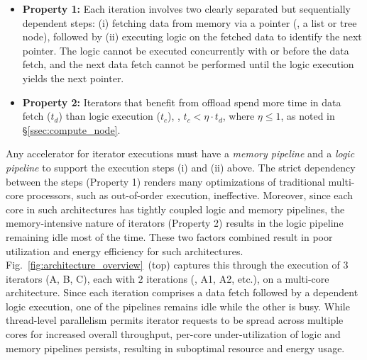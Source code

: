 \begin{itemize}[leftmargin=*, itemsep=0pt]
  \item \textbf{Property 1:} Each iteration involves two clearly separated but sequentially dependent steps: (i) fetching data from memory via a pointer (\eg, a list or tree node), followed by (ii) executing logic on the fetched data to identify the next pointer. The logic cannot be executed concurrently with or before the data fetch, and the next data fetch cannot be performed until the logic execution yields the next pointer.
 
  \item \textbf{Property 2:} Iterators that benefit from offload spend more time in data fetch ($t_d$) than logic execution ($t_c$), \ie, $t_c < \eta \cdot t_d$, where $\eta \leq 1$, as noted in \S\ref{ssec:compute_node}. 
\end{itemize}
\noindent
Any accelerator for iterator executions must have a \emph{memory pipeline} and a \emph{logic pipeline} to support the execution steps (i) and (ii) above. 
The strict dependency between the steps (Property 1) renders many optimizations of traditional multi-core processors, such as out-of-order execution, ineffective. Moreover, since each core in such architectures has tightly coupled logic and memory pipelines, the memory-intensive nature of iterators (Property 2) results in the logic pipeline remaining idle most of the time. These two factors combined result in poor utilization and energy efficiency for such architectures. Fig.~\ref{fig:architecture_overview}~(top) captures this through the execution of 3 iterators (A, B, C), each with $2$ iterations (\eg, A1, A2, etc.), on a multi-core architecture. Since each iteration comprises a data fetch followed by a dependent logic execution, one of the pipelines remains idle while the other is busy. While thread-level parallelism permits iterator requests to be spread across multiple cores for increased overall throughput, per-core under-utilization of logic and memory pipelines persists, resulting in suboptimal resource and energy usage.



